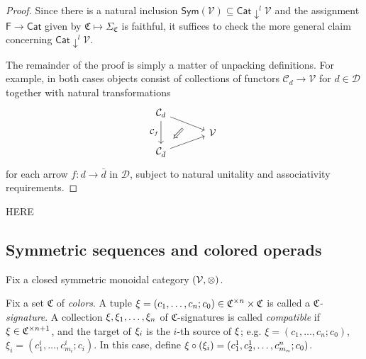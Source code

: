 \documentclass[a4paper,10pt
,draft
]{article}%
\renewcommand{\1}{\eta}%
\begin{document}
\begin{proof}
Since there is a natural inclusion
$\mathsf{Sym}(\mathcal{V}) 
\subseteq 
\mathsf{Cat} \downarrow^l \mathcal{V}$
and the assignment $\mathsf{F} \to \mathsf{Cat}$ 
given by $\mathfrak{C} \mapsto \Sigma_{\mathfrak{C}}$ 
is faithful, it suffices to check the more general claim concerning
$\mathsf{Cat} \downarrow^l \mathcal{V}$.

The remainder of the proof is simply a matter of unpacking definitions. For example, in both cases objects consist of collections of functors $\mathcal{C}_d \to \mathcal{V}$ for $d \in \mathcal{D}$ together with natural transformations
	\begin{equation}
	\begin{tikzcd}[row sep = tiny, column sep = 35pt]
		\mathcal{C}_{d} \arrow{dr}[name=U]{} \arrow{dd}[swap]{\mathcal{C}_{f}}
	\\
		& \mathcal{V}
	\\
		|[alias=V]| \mathcal{C}_{\bar{d}} \arrow{ur}[swap]{}
	\arrow[Leftarrow, from=V, to=U,shorten >=0.25cm,shorten <=0.25cm
	,swap
	]
	\end{tikzcd}
	\end{equation}
for each arrow $f \colon d \to \bar{d}$ in $\mathcal{D}$, subject to natural unitality and associativity requirements.
\end{proof}



{\color{red} HERE}





\subsection{Symmetric sequences and colored operads}

Fix a closed symmetric monoidal category $(\mathcal V, \otimes)$.

\begin{definition}
      Fix a set $\mathfrak C$ of \textit{colors}.
      A tuple
      $\xi = (c_1, \ldots, c_n; c_0) \in \mathfrak C^{\times n} \times \mathfrak C$
      is called a \textit{$\mathfrak C$-signature}.
      A collection $\xi, \xi_1,\dots, \xi_n$ of $\mathfrak C$-signatures is called \textit{compatible} if
      $\xi \in \mathfrak C^{\times n+1}$, and the target of $\xi_i$ is the $i$-th source of $\xi$;
      e.g.  $\xi = (c_1, \ldots, c_n; c_0)$, $\xi_i = (c_{1}^i, \ldots, c_{m_i}^i; c_i)$.
      In this case, define $\xi \circ (\xi_i) = (c_1^1,c_2^1,\dots,c_{m_n}^{n}; c_0)$.
\end{definition}
\end{document}
